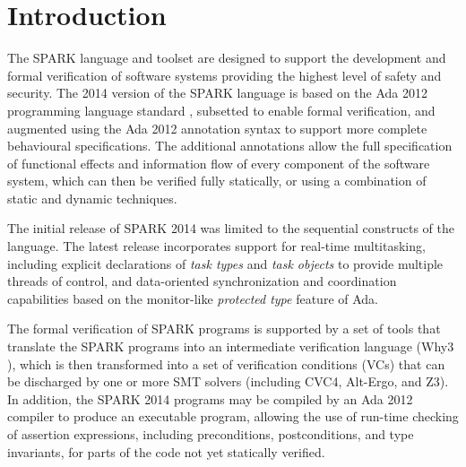 \documentclass[10pt,conference,compsocconf]{IEEEtran}
\begin{document}



\section{Introduction}
The SPARK language and toolset \cite{spark} are designed to support the
development and formal verification of software systems providing the
highest level of safety and security. The 2014 version of the SPARK
language is based on the Ada 2012 programming language standard \cite{lrm},
subsetted to enable formal verification, and augmented using the Ada 2012
annotation syntax to support more complete behavioural specifications. The
additional annotations allow the full specification of functional effects
and information flow of every component of the software system, which can
then be verified fully statically, or using a combination of static and
dynamic techniques.

The initial release of SPARK 2014 was limited to the sequential constructs
of the language. The latest release incorporates support for real-time
multitasking, including explicit declarations of \emph{task types} and
\emph{task objects} to provide multiple threads of control, and
data-oriented synchronization and coordination capabilities based on the
monitor-like \emph{protected type} feature of Ada.

The formal verification of SPARK programs is supported by a set of tools
that translate the SPARK programs into an intermediate verification
language (Why3 \cite{why3}), which is then transformed into a set of
verification conditions (VCs) that can be discharged by one or more SMT
solvers \cite{smt} (including CVC4, Alt-Ergo, and Z3). In addition, the
SPARK 2014 programs may be compiled by an Ada 2012 compiler to produce an
executable program, allowing the use of run-time checking of assertion
expressions, including preconditions, postconditions, and type invariants,
for parts of the code not yet statically verified.
\end{document}
